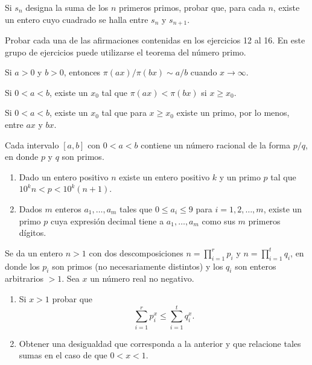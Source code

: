 \documentclass[12pt,a4paper]{book}
\begin{document}
    \begin{ejercicio}
        Si $s_n$ designa la suma de los $n$ primeros primos, probar que, para cada
        $n$, existe un entero cuyo cuadrado se halla entre $s_n$ y $s_{n+1}$.
    \end{ejercicio}

    Probar cada una de las afirmaciones contenidas en los ejercicios 12 al 16. En
    este grupo de ejercicios puede utilizarse el teorema del número primo.

    \begin{ejercicio}
        Si $a>0$ y $b>0$, entonces $\pi(ax)/\pi(bx)\sim a/b$ cuando $x\to\infty$.
    \end{ejercicio}

    \begin{ejercicio}
        Si $0<a<b$, existe un $x_0$ tal que $\pi(ax)<\pi(bx)$ si $x\geq x_0$.
    \end{ejercicio}

    \begin{ejercicio}
        Si $0<a<b$, existe un $x_0$ tal que para $x\geq x_0$ existe un primo, por lo
        menos, entre $ax$ y $bx$.
    \end{ejercicio}

    \begin{ejercicio}
        Cada intervalo $[a,b]$ con $0<a<b$ contiene un número racional de la forma
        $p/q$, en donde $p$ y $q$ son primos.
    \end{ejercicio}

    \begin{ejercicio}
        \begin{enumerate}
            \item[(a)] Dado un entero positivo $n$ existe un entero positivo $k$ y un
            primo $p$ tal que $10^kn<p<10^k(n+1)$.
            \item[(b)] Dados $m$ enteros $a_1,\dots,a_m$ tales que $0\leq a_i\leq9$
            para $i=1,2,\dots,m$, existe un primo $p$ cuya expresión decimal tiene a
            $a_1,\dots,a_m$ como sus $m$ primeros dígitos.
        \end{enumerate}
    \end{ejercicio}

    \begin{ejercicio}
        Se da un entero $n>1$ con dos descomposiciones $n=\prod_{i=1}^{r}p_i$ y
        $n=\prod_{i=1}^{t}q_i$, en donde los $p_i$ son primos (no necesariamente
        distintos) y los $q_i$ son enteros arbitrarios $>1$. Sea $x$ un número real no
        negativo.
        \begin{enumerate}
            \item[(a)] Si $x>1$ probar que
            \begin{equation*}
                \sum_{i=1}^{r}p_i^x\leq\sum_{i=1}^{t}q_i^x.
            \end{equation*}
            \item[(b)] Obtener una desigualdad que corresponda a la anterior y que
            relacione tales sumas en el caso de que $0<x<1$.
        \end{enumerate}
    \end{ejercicio}
\end{document}
